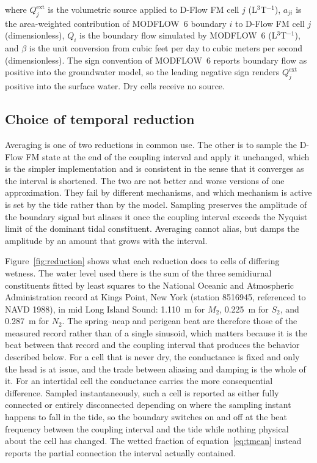 \documentclass[preprint,authoryear,11pt]{elsarticle}
\begin{document}
\noindent where $Q_{j}^{\mathrm{ext}}$ is the volumetric source applied to D-Flow FM cell $j$ (L$^{3}$T$^{-1}$), $a_{ji}$ is the area-weighted contribution of MODFLOW~6 boundary $i$ to D-Flow FM cell $j$ (dimensionless), $Q_{i}$ is the boundary flow simulated by MODFLOW~6 (L$^{3}$T$^{-1}$), and $\beta$ is the unit conversion from cubic feet per day to cubic meters per second (dimensionless). The sign convention of MODFLOW~6 reports boundary flow as positive into the groundwater model, so the leading negative sign renders $Q_{j}^{\mathrm{ext}}$ positive into the surface water. Dry cells receive no source.

\subsection{Choice of temporal reduction}
\label{sec:reduction}

Averaging is one of two reductions in common use. The other is to sample the D-Flow FM state at the end of the coupling interval and apply it unchanged, which is the simpler implementation and is consistent in the sense that it converges as the interval is shortened. The two are not better and worse versions of one approximation. They fail by different mechanisms, and which mechanism is active is set by the tide rather than by the model. Sampling preserves the amplitude of the boundary signal but aliases it once the coupling interval exceeds the Nyquist limit of the dominant tidal constituent. Averaging cannot alias, but damps the amplitude by an amount that grows with the interval.

Figure~\ref{fig:reduction} shows what each reduction does to cells of differing wetness. The water level used there is the sum of the three semidiurnal constituents fitted by least squares to the National Oceanic and Atmospheric Administration record at Kings Point, New York (station 8516945, referenced to NAVD 1988), in mid Long Island Sound: \SI{1.110}{\meter} for $M_2$, \SI{0.225}{\meter} for $S_2$, and \SI{0.287}{\meter} for $N_2$. The spring--neap and perigean beat are therefore those of the measured record rather than of a single sinusoid, which matters because it is the beat between that record and the coupling interval that produces the behavior described below. For a cell that is never dry, the conductance is fixed and only the head is at issue, and the trade between aliasing and damping is the whole of it. For an intertidal cell the conductance carries the more consequential difference. Sampled instantaneously, such a cell is reported as either fully connected or entirely disconnected depending on where the sampling instant happens to fall in the tide, so the boundary switches on and off at the beat frequency between the coupling interval and the tide while nothing physical about the cell has changed. The wetted fraction of equation~\ref{eq:tmean} instead reports the partial connection the interval actually contained.
\end{document}
